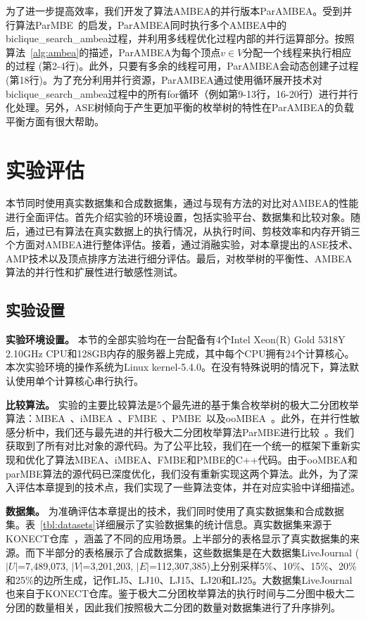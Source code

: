 为了进一步提高效率，我们开发了算法AMBEA的并行版本ParAMBEA。受到并行算法ParMBE~\cite{parMBE18}的启发，ParAMBEA同时执行多个AMBEA中的\textsf{biclique\_search\_ambea}过程，并利用多线程优化过程内部的并行运算部分。按照算法~\ref{alg:ambea}的描述，ParAMBEA为每个顶点$v\in V$分配一个线程来执行相应的过程 (第2-4行)。此外，只要有多余的线程可用，ParAMBEA会动态创建子过程 (第18行)。为了充分利用并行资源，ParAMBEA通过使用循环展开技术对\textsf{biclique\_search\_ambea}过程中的所有for循环（例如第9-13行，16-20行）进行并行化处理。另外，ASE树倾向于产生更加平衡的枚举树的特性在ParAMBEA的负载平衡方面有很大帮助。

\section{实验评估}

本节同时使用真实数据集和合成数据集，通过与现有方法的对比对AMBEA的性能进行全面评估。首先介绍实验的环境设置，包括实验平台、数据集和比较对象。随后，通过已有算法在真实数据上的执行情况，从执行时间、剪枝效率和内存开销三个方面对AMBEA进行整体评估。接着，通过消融实验，对本章提出的ASE技术、AMP技术以及顶点排序方法进行细分评估。最后，对枚举树的平衡性、AMBEA算法的并行性和扩展性进行敏感性测试。

\subsection{实验设置}

\textbf{实验环境设置。} 本节的全部实验均在一台配备有4个Intel Xeon(R) Gold 5318Y 2.10GHz CPU和128GB内存的服务器上完成，其中每个CPU拥有24个计算核心。本次实验环境的操作系统为Linux kernel-5.4.0。在没有特殊说明的情况下，算法默认使用单个计算核心串行执行。

\textbf{比较算法。} 实验的主要比较算法是5个最先进的基于集合枚举树的极大二分团枚举算法：MBEA~\cite{iMBEA14}、iMBEA~\cite{iMBEA14}、FMBE~\cite{parMBE18}、PMBE~\cite{PMBE20}以及ooMBEA~\cite{ooMBE22}。此外，在并行性敏感分析中，我们还与最先进的并行极大二分团枚举算法ParMBE进行比较~\cite{parMBE18}。我们获取到了所有对比对象的源代码。为了公平比较，我们在一个统一的框架下重新实现和优化了算法MBEA、iMBEA、FMBE和PMBE的C++代码。由于ooMBEA和parMBE算法的源代码已深度优化，我们没有重新实现这两个算法。此外，为了深入评估本章提到的技术点，我们实现了一些算法变体，并在对应实验中详细描述。

 

\textbf{数据集。} 为准确评估本章提出的技术，我们同时使用了真实数据集和合成数据集。表~\ref{tbl:datasets}详细展示了实验数据集的统计信息。真实数据集来源于KONECT仓库~\cite{konect}，涵盖了不同的应用场景。上半部分的表格显示了真实数据集的来源。而下半部分的表格展示了合成数据集，这些数据集是在大数据集LiveJournal ($|U|$=7,489,073, $|V|$=3,201,203, $|E|$=112,307,385)上分别采样5\%、10\%、15\%、20\%和25\%的边所生成，记作LJ5、LJ10、LJ15、LJ20和LJ25。大数据集LiveJournal也来自于KONECT仓库。鉴于极大二分团枚举算法的执行时间与二分图中极大二分团的数量相关，因此我们按照极大二分团的数量对数据集进行了升序排列。

